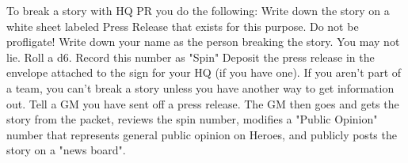 \documentclass[green]{LRSguildcamp1}
\begin{document}
To break a story with HQ PR you do the following:
Write down the story on a white sheet labeled Press Release that exists for this purpose. Do not be profligate! 
Write down your name as the person breaking the story. You may not lie. 
Roll a d6. Record this number as "Spin"
Deposit the press release in the envelope attached to the sign for your HQ (if you have one). If you aren't part of a team, you can't break a story unless you have another way to get information out. Tell a GM you have sent off a press release.
The GM then goes and gets the story from the packet, reviews the spin number, modifies a "Public Opinion" number that represents general public opinion on Heroes, and publicly posts the story on a "news board". 
\end{document}
